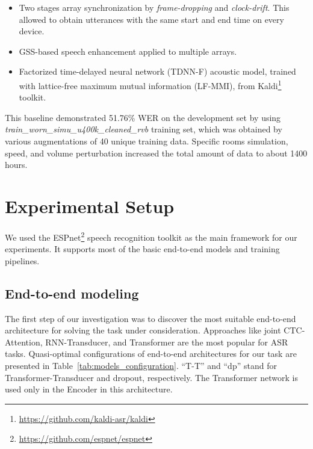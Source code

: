 \documentclass[a4paper]{article}
\begin{document}
\begin{itemize}
    \item Two stages array synchronization by \textit{frame-dropping} and \textit{clock-drift}. This allowed to obtain utterances with the same start and end time on every device.  
    \item GSS-based speech enhancement \cite{boeddecker_front-end_2018} applied to multiple arrays.
    \item Factorized time-delayed neural network (TDNN-F) acoustic model, trained with lattice-free maximum mutual information (LF-MMI), from Kaldi\footnote{\url{https://github.com/kaldi-asr/kaldi}} toolkit.
\end{itemize}

This baseline demonstrated 51.76\% WER on the development set by using \textit{train\_worn\_simu\_u400k\_cleaned\_rvb} training set, which was obtained by various augmentations of 40 unique training data. Specific rooms simulation, speed, and volume perturbation increased the total amount of data to about 1400 hours.

\section{Experimental Setup}
\label{section:exp}

We used the ESPnet\footnote{\url{https://github.com/espnet/espnet}} speech recognition toolkit \cite{watanabe_espnet:_2018} as the main framework for our experiments. It supports most of the basic end-to-end models and training pipelines.

\subsection{End-to-end modeling}

The first step of our investigation was to discover the most suitable end-to-end architecture for solving the task under consideration. Approaches like joint CTC-Attention, RNN-Transducer, and Transformer are the most popular for ASR tasks. Quasi-optimal configurations of end-to-end architectures for our task are presented in Table~\ref{tab:models_configuration}. ``T-T'' and ``dp'' stand for Transformer-Transducer and dropout, respectively. The Transformer network is used only in the Encoder in this architecture.
\end{document}
